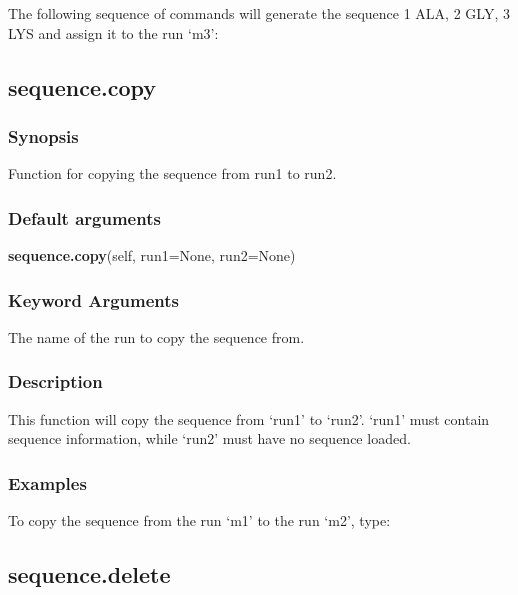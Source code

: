 The following sequence of commands will generate the sequence 1 ALA, 2 GLY, 3 LYS and assign
it to the run `m3':





\newpage

\subsection{sequence.copy}


\subsubsection{Synopsis}

Function for copying the sequence from run1 to run2.

\subsubsection{Default arguments}

\textsf{\textbf{sequence.copy}(self, run1=None, run2=None)}


\subsubsection{Keyword Arguments}

  The name of the run to copy the sequence from.


\subsubsection{Description}

This function will copy the sequence from `run1' to `run2'.  `run1' must contain sequence
information, while `run2' must have no sequence loaded.


\subsubsection{Examples}

To copy the sequence from the run `m1' to the run `m2', type:




\newpage

\subsection{sequence.delete}


